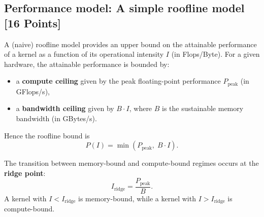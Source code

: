\documentclass[unicode,10pt,a4paper,oneside,numbers=endperiod,openany]{scrartcl}
\begin{document}
\subsection{Performance model: A simple roofline model [16 Points]}
A (naive) roofline model provides an upper bound on the attainable performance of a kernel as a function of
its operational intensity $I$ (in Flops/Byte). For a given hardware, the attainable performance is bounded by:
\begin{itemize}
  \item a \textbf{compute ceiling} given by the peak floating-point performance $P_{\text{peak}}$ (in GFlops/s),
  \item a \textbf{bandwidth ceiling} given by $B \cdot I$, where $B$ is the sustainable memory bandwidth (in GBytes/s).
\end{itemize}
Hence the roofline bound is
$$
P(I) = \min\left(P_{\text{peak}},\; B \cdot I\right).
$$

The transition between memory-bound and compute-bound regimes occurs at the \textbf{ridge point}:
\begin{equation}
I_{\text{ridge}} = \frac{P_{\text{peak}}}{B}.
\label{eq:ridge}
\end{equation}
A kernel with $I < I_{\text{ridge}}$ is memory-bound, while a kernel with $I > I_{\text{ridge}}$ is compute-bound.\\
\end{document}
